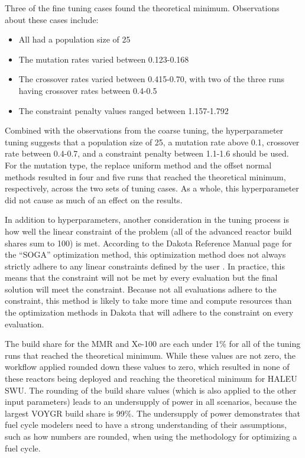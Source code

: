 Three of the fine tuning cases found the theoretical minimum. Observations about 
these cases include:
\begin{itemize}
    \item All had a population size of 25
    \item The mutation rates varied between 0.123-0.168
    \item The crossover rates varied between 0.415-0.70, with two of the three 
          runs having crossover rates between 0.4-0.5
    \item The constraint penalty values ranged between 1.157-1.792
\end{itemize}
Combined with the observations from the coarse tuning, the hyperparameter 
tuning suggests that a population size of 25, a mutation rate above 
0.1, crossover rate between 0.4-0.7, and a constraint penalty 
between 1.1-1.6 should be used. For the mutation type, the replace uniform 
method and the offset normal methods resulted in four and five runs that 
reached the theoretical minimum, respectively, across the two sets of 
tuning cases. As a whole, this hyperparameter did not cause as much of 
an effect on the results.

In addition to hyperparameters, another consideration in the tuning process 
is how well the linear constraint of the problem (all of the advanced 
reactor build shares sum to 100) is met. According to the Dakota 
Reference Manual page for the ``SOGA'' optimization method, this 
optimization method does not always strictly adhere to any linear 
constraints defined by the user \cite{adams_dakota_2019}. In practice, 
this means that the constraint will not be met by every evaluation but the 
final solution will meet the constraint. Because not all evaluations 
adhere to the constraint, this method is likely to take more time and 
compute resources than the optimization methods in Dakota that will 
adhere to the constraint on every evaluation. 

The build share for the \gls{MMR} and Xe-100 are each under 1\% for all of 
the tuning runs that reached the theoretical minimum. While these values 
are not zero, the workflow applied rounded down these values to zero, which 
resulted in none of these reactors being deployed and reaching the 
theoretical minimum for \gls{HALEU} {SWU}. The rounding of the build share 
values (which is also applied to the other input parameters) leads to an 
undersupply of power in all scenarios, because the largest VOYGR build 
share is 99\%. The undersupply of power demonstrates that fuel cycle 
modelers need to have a strong understanding of their assumptions, such 
as how numbers are rounded, when using the methodology for optimizing a 
fuel cycle. 

